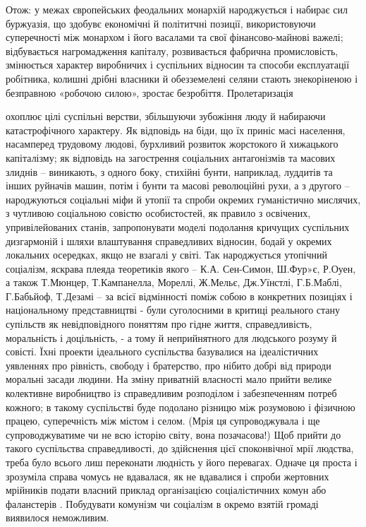 \documentclass{kapital}
\begin{document}
 
 
	 Отож: у межах європейських феодальних монархій народжується і набирає сил буржуазія, що здобувє економічні й політитчні позиції, використовуючи суперечності між монархом і його васалами та свої фінансово-майнові важелі;  відбувається  нагромадження капіталу, розвивається фабрична промисловість, змінюється характер  виробничих і суспільних відносин та способи експлуатації робітника, колишні дрібні власники й обезземелені селяни стають знекоріненою і безправною «робочою силою», зростає безробіття. Пролетаризація
 
охоплює цілі суспільні верстви, збільшуючи  зубожіння люду й набираючи катастрофічного характеру. Як відповідь на біди, що їх приніс масі населення, насамперед трудовому людові, бурхливий розвиток жорстокого й хижацького  капіталізму; як відповідь на загострення соціальних антагонізмів та масових злиднів – виникають, з одного боку, стихійні бунти, наприклад, луддитів та інших руйначів машин, потім і бунти та масові революційні рухи, а з другого – народжуються соціальні міфи й утопії та  спроби окремих  гуманістично мислячих, з чутливою соціальною совістю особистостей, як правило з освічених, упривілейованих станів, запропонувати моделі подолання кричущих суспільних дизгармоній і шляхи влаштування справедливих відносин, бодай у окремих локальних осередках, якщо не взагалі у світі. Так народжується утопічний соціалізм, яскрава  плеяда теоретиків якого – К.А. Сен-Симон, Ш.Фур»є, Р.Оуен, а також  Т.Мюнцер, Т.Кампанелла, Мореллі, Ж.Мельє, Дж.Уїнстлі, Г.Б.Маблі, Г.Бабьйоф, Т.Дезамі – за всієї відмінності поміж собою в конкретних позиціях і національному представництві -  були суголосними в критиці реального стану супільств як невідповідного поняттям про гідне життя, справедливість, моральність і доцільність, - а тому й неприйнятного для людського розуму й совісті. Їхні проекти ідеального суспільства базувалися на ідеалістичних уявленнях про рівність, свободу і братерство, про нібито добрі від природи моральні засади людини. На зміну приватній власності мало прийти велике колективне виробництво із справедливим розподілом і забезпеченням потреб кожного; в такому суспільстві буде подолано різницю між розумовою і фізичною працею,  суперечність між містом і селом. (Мрія ця супроводжувала і ще супроводжуватиме чи не всю історію світу, вона позачасова!) Щоб прийти до такого суспільства справедливості, до здійснення цієї споконвічної мрії людства, треба було всього лиш переконати людність у його перевагах. Одначе ця проста і зрозуміла  справа чомусь не вдавалася, як не вдавалися і спроби жертовних мрійників подати власний приклад організацією соціалістичних комун або фаланстерів . Побудувати комунізм чи соціалізм в окремо взятій громаді виявилося неможливим.
 
\end{document}
